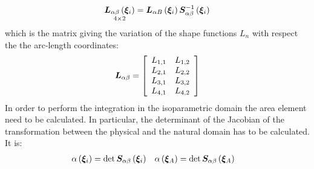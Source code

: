 \begin{equation}
\underset{ 4 \times 2 } { \T{ L }_{ \alpha \beta } \valxii }=
\T{ L }_{ \alpha B } \valxii \T{S}_{\alpha \beta} ^{-1} \valxii
\end{equation}
which is the matrix giving the variation of the shape functions $L_n$ with respect the the arc-length coordinates:
\begin{equation}
\T{L}_{\alpha \beta} =
\sqbr{ \matr{ c c }{
L_{1,1} & L_{1,2} \\
L_{2,1} & L_{2,2} \\
L_{3,1} & L_{3,2} \\
L_{4,1} & L_{4,2}
}}
\end{equation}
In order to perform the integration in the isoparametric domain the area element need to be calculated. In particular, the determinant of the Jacobian of the transformation between the physical and the natural domain has to be calculated. It is:
\begin{align}
\alpha \valxii & = \det \T{ S }_{\alpha \beta} \valxii &
\alpha \valxiA & = \det \T{ S }_{\alpha \beta} \valxiA
\end{align}
